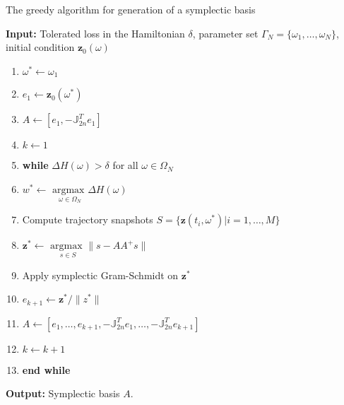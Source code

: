 {\edit
\begin{algorithm} 
\caption{The greedy algorithm for generation of a symplectic basis} \label{alg:SyMo:3}
{\bf Input:} Tolerated loss in the Hamiltonian $\delta$, parameter set $\Gamma_N = \{\omega_1,\dots,\omega_N\}$, initial condition $\mathbf z_0(\omega)$
\begin{enumerate}
\item $\omega^* \leftarrow \omega_1$
\item $e_1 \leftarrow \mathbf z_0(\omega^*)$
\item $A \leftarrow [e_1,-\mathbb J^T_{2n}e_1]$
\item $k \leftarrow 1$
\item \textbf{while} $\Delta H(\omega) > \delta$ for all $\omega \in \Omega_N$
\item \hspace{0.5cm} $w^* \leftarrow$ $\underset{\omega\in \Omega_N}{\text{argmax }}\Delta H(\omega)$
\item \hspace{0.5cm} Compute trajectory snapshots $S=\{ \mathbf z(t_i,\omega^*) | i = 1,\dots,M \}$
\item \hspace{0.5cm} $\mathbf z^* \leftarrow$ $\underset{s\in S}{\text{argmax }} \| s - AA^+s \|$
\item \hspace{0.5cm} Apply symplectic Gram-Schmidt on $\mathbf z^*$
\item \hspace{0.5cm} $e_{k+1} \leftarrow \mathbf z^*/ \| z^*\|$
\item \hspace{0.5cm} $A \leftarrow [e_1,\dots ,e_{k+1} , -\mathbb J^T_{2n}e_1,\dots,-\mathbb J^T_{2n}e_{k+1}]$
\item \hspace{0.5cm} $k \leftarrow k+1$
\item \textbf{end while}
\end{enumerate}
\vspace{0.5cm}
{\bf Output:} Symplectic basis $A$.
\end{algorithm}
}

